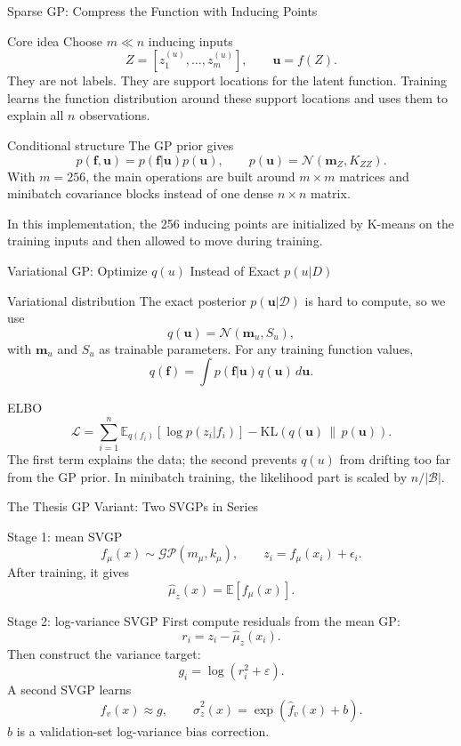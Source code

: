 \documentclass[UTF8,aspectratio=169]{ctexbeamer}
\begin{document}
\begin{frame}{Sparse GP: Compress the Function with Inducing Points}
\small
\begin{block}{Core idea}
\footnotesize
Choose \(m\ll n\) inducing inputs
\[
Z=[z_1^{(u)},\ldots,z_m^{(u)}],
\qquad
\mathbf u=f(Z).
\]
They are not labels. They are support locations for the latent function.
Training learns the function distribution around these support locations and
uses them to explain all \(n\) observations.
\end{block}

\begin{block}{Conditional structure}
\footnotesize
The GP prior gives
\[
p(\mathbf f,\mathbf u)=p(\mathbf f|\mathbf u)p(\mathbf u),
\qquad
p(\mathbf u)=\mathcal N(\mathbf m_Z,K_{ZZ}).
\]
With \(m=256\), the main operations are built around \(m\times m\) matrices and
minibatch covariance blocks instead of one dense \(n\times n\) matrix.
\end{block}

\footnotesize
In this implementation, the 256 inducing points are initialized by K-means on
the training inputs and then allowed to move during training.
\end{frame}

\begin{frame}{Variational GP: Optimize \(q(u)\) Instead of Exact \(p(u|D)\)}
\small
\begin{block}{Variational distribution}
\footnotesize
The exact posterior \(p(\mathbf u|\mathcal D)\) is hard to compute, so we use
\[
q(\mathbf u)=\mathcal N(\mathbf m_u,S_u),
\]
with \(\mathbf m_u\) and \(S_u\) as trainable parameters. For any training
function values,
\[
q(\mathbf f)=\int p(\mathbf f|\mathbf u)q(\mathbf u)\,d\mathbf u.
\]
\end{block}

\begin{block}{ELBO}
\footnotesize
\[
\mathcal L
=
\sum_{i=1}^{n}
\mathbb E_{q(f_i)}[\log p(z_i|f_i)]
-
\mathrm{KL}\!\left(q(\mathbf u)\,\|\,p(\mathbf u)\right).
\]
The first term explains the data; the second prevents \(q(u)\) from drifting
too far from the GP prior. In minibatch training, the likelihood part is scaled
by \(n/|\mathcal B|\).
\end{block}
\end{frame}

\begin{frame}{The Thesis GP Variant: Two SVGPs in Series}
\small
\begin{block}{Stage 1: mean SVGP}
\footnotesize
\[
f_\mu(x)\sim\mathcal{GP}(m_\mu,k_\mu),
\qquad
z_i=f_\mu(x_i)+\epsilon_i.
\]
After training, it gives
\[
\hat\mu_z(x)=\mathbb E[f_\mu(x)].
\]
\end{block}

\begin{block}{Stage 2: log-variance SVGP}
\footnotesize
First compute residuals from the mean GP:
\[
r_i=z_i-\hat\mu_z(x_i).
\]
Then construct the variance target:
\[
g_i=\log(r_i^2+\varepsilon).
\]
A second SVGP learns
\[
f_v(x)\approx g,
\qquad
\hat\sigma_z^2(x)=\exp(\hat f_v(x)+b).
\]
\(b\) is a validation-set log-variance bias correction.
\end{block}
\end{frame}
\end{document}
